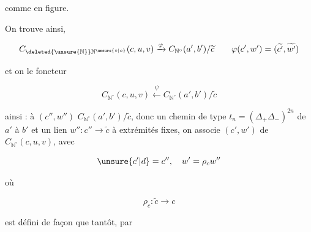 comme en figure.

On trouve ainsi, 

\[
C_{\deleted{\unsure{\mathbb{N}}}\mathbb{N}^{\unsure{\circ|o}}}(c,u,v)
\xrightarrow{\varphi} C_{\mathbb{N}^{\circ}}(a',b')/\widetilde c
\qquad\varphi(c',w')=(\widetilde{c'},\widetilde{w'})
\]

et on  le foncteur

\[
C_{\mathbb{N}^{\circ}}(c,u,v)\xleftarrow{\psi}
C_{\mathbb{N}^{\circ}}(a',b')/\widetilde c
\]

ainsi : à $(c'',w'')$  $C_{\mathbb{N}^{\circ}}(a',b')/\widetilde c$, donc un chemin  de type $t_n=(\Delta_+\Delta_-)^{2n}$ de $a'$ à $b'$ et un lien $w''\colon c''\longrightarrow\widetilde c$ à extrémités fixes, on associe  $(c',w')$ de $C_{\mathbb{N}^{\circ}}(c,u,v)$, avec

\[
\unsure{c'|d}=c'',\quad w'=\rho_c w''
\]

où

\[
\rho_c\colon\widetilde c\longrightarrow c
\]

est défini de façon  que tantôt, par
